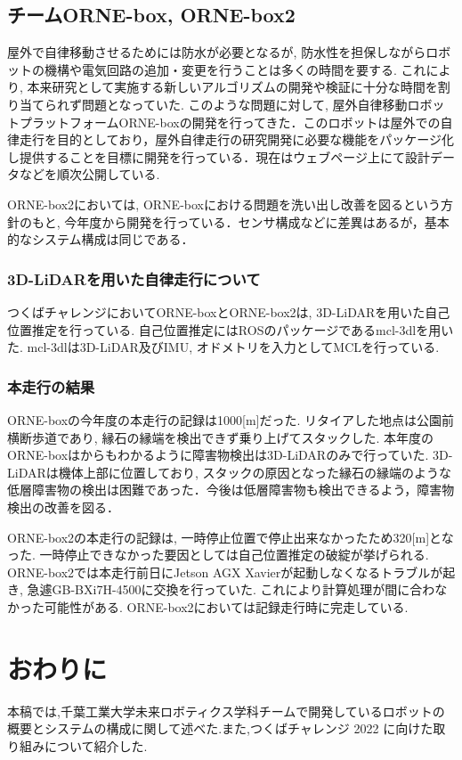 \documentclass[uplatex, twocolumn, 9pt]{jsproceedings}
\begin{document}
\newpage
\subsection{チームORNE-box, ORNE-box2}
屋外で自律移動させるためには防水が必要となるが, 防水性を担保しながらロボットの機構や電気回路の追加・変更を行うことは多くの時間を要する. これにより, 本来研究として実施する新しいアルゴリズムの開発や検証に十分な時間を割り当てられず問題となっていた. このような問題に対して, 屋外自律移動ロボットプラットフォームORNE-boxの開発\cite{si-box}を行ってきた．このロボットは屋外での自律走行を目的としており，屋外自律走行の研究開発に必要な機能をパッケージ化し提供することを目標に開発を行っている．現在はウェブページ上\cite{box}にて設計データなどを順次公開している. \par 
ORNE-box2においては, ORNE-boxにおける問題を洗い出し改善を図るという方針のもと, 今年度から開発を行っている．センサ構成などに差異はあるが，基本的なシステム構成は同じである．

\subsubsection{3D-LiDARを用いた自律走行について}
つくばチャレンジにおいてORNE-boxとORNE-box2は, 3D-LiDARを用いた自己位置推定を行っている. 自己位置推定にはROSのパッケージであるmcl-3dl\cite{mcl-3dl}を用いた. mcl-3dlは3D-LiDAR及びIMU, オドメトリを入力としてMCLを行っている.

\subsubsection{本走行の結果}
ORNE-boxの今年度の本走行の記録は1000[m]だった. リタイアした地点は公園前横断歩道であり, 縁石の縁端を検出できず乗り上げてスタックした. 本年度のORNE-boxはからもわかるように障害物検出は3D-LiDARのみで行っていた. 3D-LiDARは機体上部に位置しており, スタックの原因となった縁石の縁端のような低層障害物の検出は困難であった．今後は低層障害物も検出できるよう，障害物検出の改善を図る．\par
ORNE-box2の本走行の記録は, 一時停止位置で停止出来なかったため320[m]となった. 一時停止できなかった要因としては自己位置推定の破綻が挙げられる. ORNE-box2では本走行前日にJetson AGX Xavierが起動しなくなるトラブルが起き, 急遽GB-BXi7H-4500に交換を行っていた. これにより計算処理が間に合わなかった可能性がある. ORNE-box2においては記録走行時に完走している. 

\section{おわりに}
本稿では,千葉工業大学未来ロボティクス学科チームで開発しているロボットの概要とシステムの構成に関して述べた.また,つくばチャレンジ 2022 に向けた取り組みについて紹介した.
\end{document}

